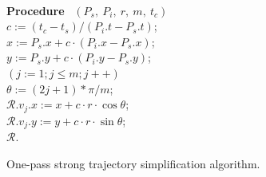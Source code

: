 \begin{figure}[tb!]
\begin{center}
{\begin{minipage}{3.3in}
{					%
					\\
					{\bf Procedure} ~$(P_s,~P_i,~r,~m,~t_c)$ \\
					\bcc \hspace{1ex} $c := (t_c-t_s)/(P_i.t - P_s.t)$; \\
					\icc \hspace{1ex} $x := P_s.x + c\cdot(P_i.x-P_s.x)$; \\
					\icc \hspace{1ex} $y := P_s.y + c\cdot(P_i.y-P_s.y)$; \\
					\icc \hspace{1ex} \For $(j := 1;j \le m;j++)$ \Do \\
					\icc \> \hspace{2ex} $\theta :=  (2j + 1)*\pi /m $; \\
					\icc \> \hspace{2ex} $\mathcal{R}.v_j.x := x + c\cdot r\cdot\cos\theta$;\\
					\icc \> \hspace{2ex} $\mathcal{R}.v_j.y := y + c\cdot r\cdot\sin\theta$;\\
					\icc \hspace{1ex} \Return $\mathcal{R}$.
				}
				\vspace{-2ex}
				\myhrule
			\end{minipage}
		}
	\end{center}
	\vspace{-2ex}
	\caption{\small One-pass strong trajectory  simplification algorithm.}
	\label{alg:CI3d}
	\vspace{-2ex}
\end{figure}





